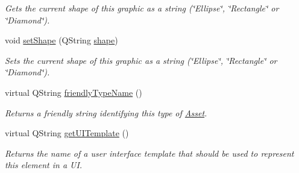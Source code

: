\begin{DoxyCompactItemize}
\begin{DoxyCompactList}\small\item\em Gets the current shape of this graphic as a string (\char`\"{}\-Ellipse\char`\"{}, \char`\"{}\-Rectangle\char`\"{} or \char`\"{}\-Diamond\char`\"{}). \end{DoxyCompactList}\item 
\hypertarget{class_picto_1_1_shape_shifter_graphic_a9e2a15bbc329bf9eea2d842d84940f36}{void \hyperlink{class_picto_1_1_shape_shifter_graphic_a9e2a15bbc329bf9eea2d842d84940f36}{set\-Shape} (Q\-String \hyperlink{class_picto_1_1_shape_shifter_graphic_ace966c77442da340b866a2992552c59e}{shape})}\label{class_picto_1_1_shape_shifter_graphic_a9e2a15bbc329bf9eea2d842d84940f36}

\begin{DoxyCompactList}\small\item\em Sets the current shape of this graphic as a string (\char`\"{}\-Ellipse\char`\"{}, \char`\"{}\-Rectangle\char`\"{} or \char`\"{}\-Diamond\char`\"{}). \end{DoxyCompactList}\item 
virtual Q\-String \hyperlink{class_picto_1_1_shape_shifter_graphic_aeecbc2e28b1d1f24694d9e34d404aaf3}{friendly\-Type\-Name} ()
\begin{DoxyCompactList}\small\item\em Returns a friendly string identifying this type of \hyperlink{class_picto_1_1_asset}{Asset}. \end{DoxyCompactList}\item 
\hypertarget{class_picto_1_1_shape_shifter_graphic_ad7b00a9bafd4de894627e5d3cb6ed929}{virtual Q\-String \hyperlink{class_picto_1_1_shape_shifter_graphic_ad7b00a9bafd4de894627e5d3cb6ed929}{get\-U\-I\-Template} ()}\label{class_picto_1_1_shape_shifter_graphic_ad7b00a9bafd4de894627e5d3cb6ed929}

\begin{DoxyCompactList}\small\item\em Returns the name of a user interface template that should be used to represent this element in a U\-I. \end{DoxyCompactList}\end{DoxyCompactItemize}

